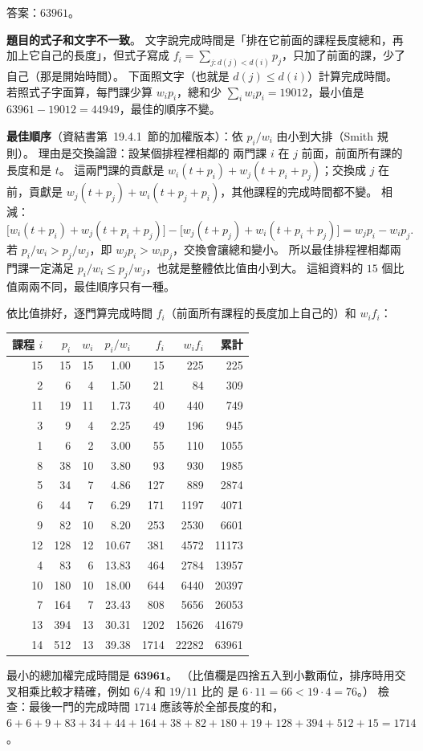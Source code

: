 \begin{pastsoln}
答案：$63961$。

\textbf{題目的式子和文字不一致}。 文字說完成時間是「排在它前面的課程長度總和，再加上它自己的長度」，但式子寫成
$f_i = \sum_{j : d(j) < d(i)} p_j$，只加了前面的課，少了自己（那是開始時間）。 下面照文字（也就是 $d(j) \le d(i)$）計算完成時間。
若照式子字面算，每門課少算 $w_i p_i$，總和少 $\sum_i w_i p_i = 19012$，最小值是 $63961 - 19012 = 44949$，最佳的順序不變。

\textbf{最佳順序}（資結書第~19.4.1~節的加權版本）：依 $p_i / w_i$ 由小到大排（Smith 規則）。 理由是交換論證：設某個排程裡相鄰的
兩門課 $i$ 在 $j$ 前面，前面所有課的長度和是 $t$。 這兩門課的貢獻是 $w_i(t + p_i) + w_j(t + p_i + p_j)$；交換成 $j$ 在前，貢獻是
$w_j(t + p_j) + w_i(t + p_j + p_i)$，其他課程的完成時間都不變。 相減：
\[
\bigl[w_i(t + p_i) + w_j(t + p_i + p_j)\bigr] - \bigl[w_j(t + p_j) + w_i(t + p_i + p_j)\bigr] = w_j p_i - w_i p_j .
\]
若 $p_i / w_i > p_j / w_j$，即 $w_j p_i > w_i p_j$，交換會讓總和變小。 所以最佳排程裡相鄰兩門課一定滿足
$p_i / w_i \le p_j / w_j$，也就是整體依比值由小到大。 這組資料的 $15$ 個比值兩兩不同，最佳順序只有一種。

依比值排好，逐門算完成時間 $f_i$（前面所有課程的長度加上自己的）和 $w_i f_i$：
\begin{center}
\small
\begin{tabular}{rrrrrrr}
\toprule
課程 $i$ & $p_i$ & $w_i$ & $p_i / w_i$ & $f_i$ & $w_i f_i$ & 累計 \\
\midrule
15 & 15 & 15 & 1.00 & 15 & 225 & 225 \\
2 & 6 & 4 & 1.50 & 21 & 84 & 309 \\
11 & 19 & 11 & 1.73 & 40 & 440 & 749 \\
3 & 9 & 4 & 2.25 & 49 & 196 & 945 \\
1 & 6 & 2 & 3.00 & 55 & 110 & 1055 \\
8 & 38 & 10 & 3.80 & 93 & 930 & 1985 \\
5 & 34 & 7 & 4.86 & 127 & 889 & 2874 \\
6 & 44 & 7 & 6.29 & 171 & 1197 & 4071 \\
9 & 82 & 10 & 8.20 & 253 & 2530 & 6601 \\
12 & 128 & 12 & 10.67 & 381 & 4572 & 11173 \\
4 & 83 & 6 & 13.83 & 464 & 2784 & 13957 \\
10 & 180 & 10 & 18.00 & 644 & 6440 & 20397 \\
7 & 164 & 7 & 23.43 & 808 & 5656 & 26053 \\
13 & 394 & 13 & 30.31 & 1202 & 15626 & 41679 \\
14 & 512 & 13 & 39.38 & 1714 & 22282 & 63961 \\
\bottomrule
\end{tabular}
\end{center}
最小的總加權完成時間是 $\mathbf{63961}$。 （比值欄是四捨五入到小數兩位，排序時用交叉相乘比較才精確，例如 $6/4$ 和 $19/11$ 比的
是 $6 \cdot 11 = 66 < 19 \cdot 4 = 76$。） 檢查：最後一門的完成時間 $1714$ 應該等於全部長度的和，
$6 + 6 + 9 + 83 + 34 + 44 + 164 + 38 + 82 + 180 + 19 + 128 + 394 + 512 + 15 = 1714$。
\end{pastsoln}
